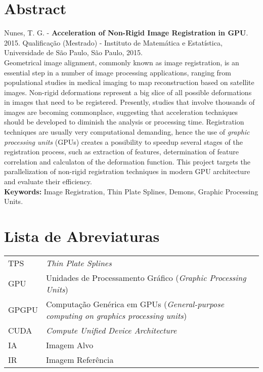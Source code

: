 \documentclass[11pt,twoside,a4paper]{book}
\begin{document}
\chapter*{Abstract}
\noindent Nunes, T. G. - \textbf{Acceleration of Non-Rigid Image Registration in GPU}.
2015.
Qualificação (Mestrado) - Instituto de Matemática e Estatística,
Universidade de São Paulo, São Paulo, 2015.
\\
Geometrical image alignment, commonly known as image registration, is an essential step in a number of image processing applications,
ranging from populational studies in medical imaging to map reconstruction based on satellite images. Non-rigid deformations
represent a big slice of all possible deformations in images that need to be registered.
Presently, studies that involve thousands of images are becoming commonplace,
suggesting that acceleration techniques should be developed to diminish the analysis or processing time.
Registration techniques are usually very computational demanding, hence the use of \textit{graphic processing units} (GPUs)
creates a possibility to speedup several stages of the registration process, such as extraction of features,
determination of feature correlation and calculaton of the deformation function. This project targets the
parallelization of non-rigid registration techniques in modern GPU architecture and evaluate their
efficiency.
\\

\noindent \textbf{Keywords:} Image Registration, Thin Plate Splines, Demons, Graphic Processing Units.

\tableofcontents    %

\chapter{Lista de Abreviaturas}
\begin{tabular}{ll}
        TPS         & \textit{Thin Plate Splines}\\
        GPU         & Unidades de Processamento Gráfico (\textit{Graphic Processing Units})\\
        GPGPU       & Computação Genérica em GPUs (\textit{General-purpose computing on graphics processing units})\\
        CUDA        & \textit{Compute Unified Device Architecture}\\
        IA          & Imagem Alvo \\
        IR          & Imagem Referência \\
\end{tabular}
\end{document}

